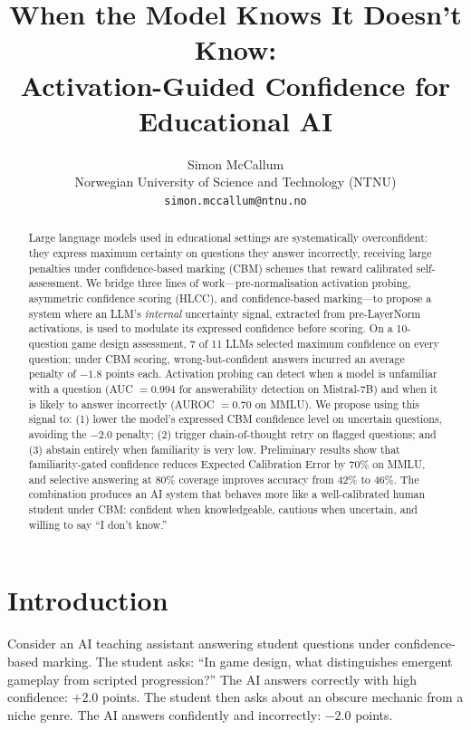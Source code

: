 \documentclass[11pt,a4paper]{article}
\title{When the Model Knows It Doesn't Know:\\Activation-Guided Confidence for Educational AI}
\author{Simon McCallum\\
Norwegian University of Science and Technology (NTNU)\\
\texttt{simon.mccallum@ntnu.no}}
\date{}
\begin{document}
\maketitle

\begin{abstract}
Large language models used in educational settings are systematically overconfident: they express maximum certainty on questions they answer incorrectly, receiving large penalties under confidence-based marking (CBM) schemes that reward calibrated self-assessment.
We bridge three lines of work---pre-normalisation activation probing, asymmetric confidence scoring (HLCC), and confidence-based marking---to propose a system where an LLM's \emph{internal} uncertainty signal, extracted from pre-LayerNorm activations, is used to modulate its expressed confidence before scoring.
On a 10-question game design assessment, 7 of 11 LLMs selected maximum confidence on every question; under CBM scoring, wrong-but-confident answers incurred an average penalty of $-1.8$ points each.
Activation probing can detect when a model is unfamiliar with a question (AUC $= 0.994$ for answerability detection on Mistral-7B) and when it is likely to answer incorrectly (AUROC $= 0.70$ on MMLU).
We propose using this signal to: (1) lower the model's expressed CBM confidence level on uncertain questions, avoiding the $-2.0$ penalty; (2) trigger chain-of-thought retry on flagged questions; and (3) abstain entirely when familiarity is very low.
Preliminary results show that familiarity-gated confidence reduces Expected Calibration Error by 70\% on MMLU, and selective answering at 80\% coverage improves accuracy from 42\% to 46\%.
The combination produces an AI system that behaves more like a well-calibrated human student under CBM: confident when knowledgeable, cautious when uncertain, and willing to say ``I don't know.''
\end{abstract}

\section{Introduction}

Consider an AI teaching assistant answering student questions under confidence-based marking.
The student asks: ``In game design, what distinguishes emergent gameplay from scripted progression?''
The AI answers correctly with high confidence: $+2.0$ points.
The student then asks about an obscure mechanic from a niche genre.
The AI answers confidently and incorrectly: $-2.0$ points.
\end{document}
